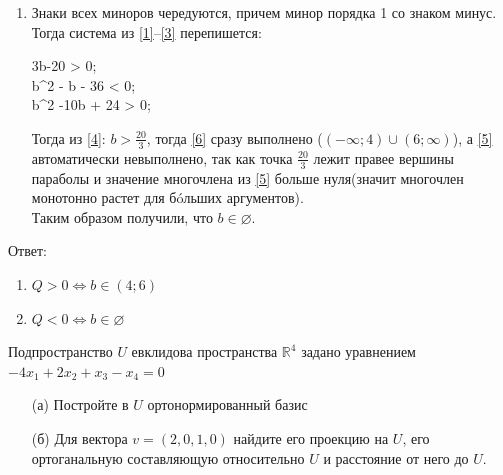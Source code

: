 \documentclass[a4paper, 12pt]{article}
\begin{document}
\begin{spacing}{1}
\begin{enumerate}
	
	\item Знаки всех миноров чередуются, причем минор порядка 1 со знаком минус. Тогда система из \eqref{1}--\eqref{3} перепишется:
		\begin{numcases}{}
		3b-20 > 0; \label{4}\\[10pt] 
		b^2 - b - 36 < 0; \label{5}\\[10pt]
		b^2 -10b + 24 > 0; \label{6} 
		\end{numcases}
	Тогда из \eqref{4}: $b > \frac{20}{3}$, тогда \eqref{6} сразу выполнено \bigg($(-\infty; 4)\cup(6;\infty)$\bigg), а \eqref{5} автоматически невыполнено, так как точка $\frac{20}{3}$ лежит правее вершины параболы и значение многочлена из \eqref{5} больше нуля(значит многочлен монотонно растет для б\'{o}льших аргументов).\\
	Таким образом получили, что $b\in \varnothing$.
\end{enumerate}
Ответ:
\begin{enumerate}
	\item $Q > 0 \Leftrightarrow b\in (4;6)$
	\item $Q < 0 \Leftrightarrow b\in \varnothing$
\end{enumerate} 



\begin{center}
\end{center}

\noindent Подпространство $ U $ евклидова пространства $ \mathbb{R}^4 $ задано уравнением $ -4x_1 + 2x_2 + x_3 - x_4 = 0 $
\begin{enumerate}
	\item[(а)] Постройте в $ U $ ортонормированный базис
	\item[(б)] Для вектора $ v = (2, 0, 1, 0) $ найдите его проекцию на $ U $, его ортоганальную составляющую относительно $ U $ и расстояние от него до $ U $.
\end{enumerate}


\end{spacing}
\end{document}
